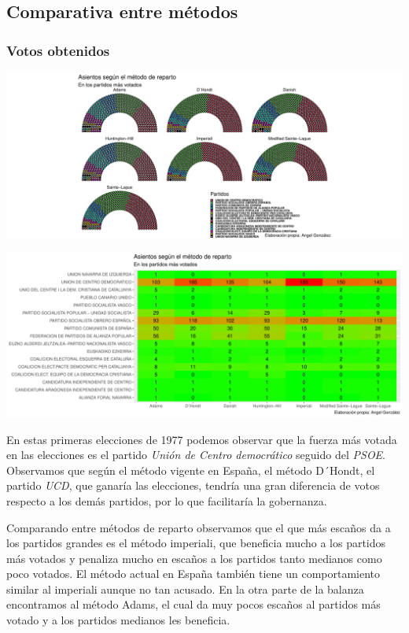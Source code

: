 \documentclass[12pt,a4paper,]{book}
\numberwithin{dummy}{section}
\theoremstyle{ocrenumbox}
\theoremstyle{blacknumex}
\theoremstyle{blacknumbox}
\theoremstyle{ocrenum}
\theoremstyle{ocrenum}
\begin{document}
\hypertarget{comparativa-entre-muxe9todos}{%
\subsection{Comparativa entre
métodos}\label{comparativa-entre-muxe9todos}}

\hypertarget{votos-obtenidos}{%
\subsubsection{Votos obtenidos}\label{votos-obtenidos}}

\begin{center}\includegraphics[width=0.95\linewidth]{figurasR/unnamed-chunk-62-1} \end{center}

\begin{center}\includegraphics[width=0.95\linewidth]{figurasR/unnamed-chunk-62-2} \end{center}

En estas primeras elecciones de 1977 podemos observar que la fuerza más
votada en las elecciones es el partido \emph{Unión de Centro
democrático} seguido del \emph{PSOE}. Observamos que según el método
vigente en España, el método D´Hondt, el partido \emph{UCD}, que ganaría
las elecciones, tendría una gran diferencia de votos respecto a los
demás partidos, por lo que facilitaría la gobernanza.

Comparando entre métodos de reparto observamos que el que más escaños da
a los partidos grandes es el método imperiali, que beneficia mucho a los
partidos más votados y penaliza mucho en escaños a los partidos tanto
medianos como poco votados. El método actual en España también tiene un
comportamiento similar al imperiali aunque no tan acusado. En la otra
parte de la balanza encontramos al método Adams, el cual da muy pocos
escaños al partidos más votado y a los partidos medianos les beneficia.
\end{document}
